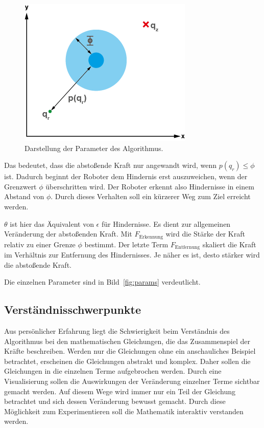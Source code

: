 \begin{figure}
  \centering
  \includegraphics[width=0.7\linewidth, height=0.7\linewidth]{img/Params}
  \caption{Darstellung der Parameter des Algorithmus.}
  \label{fig:params}
\end{figure}

Das bedeutet, dass die abstoßende Kraft nur angewandt wird, wenn $p(q_r) \leq \phi$ ist. 
Dadurch beginnt der Roboter dem Hindernis erst auszuweichen, wenn der Grenzwert $\phi$ überschritten wird.
Der Roboter erkennt also Hindernisse in einem Abstand von $\phi$.
Durch dieses Verhalten soll ein kürzerer Weg zum Ziel erreicht werden.

$\theta$ ist hier das Äquivalent von $\epsilon$ für Hindernisse. 
Es dient zur allgemeinen Veränderung der abstoßenden Kraft.
Mit $F_{\text{Erkennung}}$ wird die Stärke der Kraft relativ zu einer Grenze $\phi$ bestimmt.
Der letzte Term $F_{\text{Entfernung}}$ skaliert die Kraft im Verhältnis zur Entfernung des Hindernisses. Je näher es ist, desto stärker wird die abstoßende Kraft.

Die einzelnen Parameter sind in Bild~\vref{fig:params} verdeutlicht.


\subsection{Verständnisschwerpunkte}
Aus persönlicher Erfahrung liegt die Schwierigkeit beim Verständnis des Algorithmus bei den mathematischen Gleichungen, die das Zusammenspiel der Kräfte beschreiben.
Werden nur die Gleichungen ohne ein anschauliches Beispiel betrachtet, erscheinen die Gleichungen abstrakt und  komplex.
Daher sollen die Gleichungen in die einzelnen Terme aufgebrochen werden.
Durch eine Visualisierung sollen die Auswirkungen der Veränderung einzelner Terme sichtbar gemacht werden.
Auf diesem Wege wird immer nur ein Teil der Gleichung betrachtet und sich dessen Veränderung bewusst gemacht.
Durch diese Möglichkeit zum Experimentieren soll die Mathematik interaktiv verstanden werden. 

